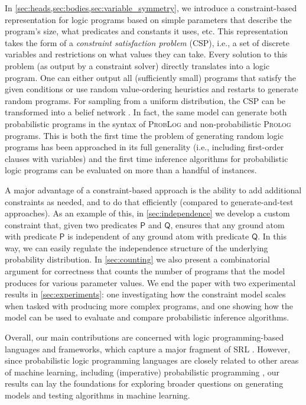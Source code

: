 \documentclass[runningheads]{llncs}
\begin{document}
In \cref{sec:heads,sec:bodies,sec:variable_symmetry}, we introduce a
constraint-based representation for logic programs based on simple parameters
that describe the program's size, what predicates and constants it uses, etc.
This representation takes the form of a \emph{constraint satisfaction problem}
(CSP), i.e., a set of discrete variables and restrictions on what values they
can take. Every solution to this problem (as output by a constraint solver)
directly translates into a logic program. One can either output all
(sufficiently small) programs that satisfy the given conditions or use random
value-ordering heuristics and restarts to generate random programs. For sampling
from a uniform distribution, the CSP can be transformed into a belief network
\cite{DBLP:conf/aaai/DechterKBE02}. In fact, the same model can generate both
probabilistic programs in the syntax of \textsc{ProbLog}
\cite{DBLP:conf/ijcai/RaedtKT07} and non-probabilistic \textsc{Prolog} programs.
This is both the first time the problem of generating random logic programs has
been approached in its full generality (i.e., including first-order clauses with
variables) and the first time inference algorithms for probabilistic logic
programs can be evaluated on more than a handful of instances.

A major advantage of a constraint-based approach is the ability to add
additional constraints as needed, and to do that efficiently (compared to
generate-and-test approaches). As an example of this, in \cref{sec:independence}
we develop a custom constraint that, given two predicates $\mathsf{P}$ and
$\mathsf{Q}$, ensures that any ground atom with predicate $\mathsf{P}$ is
independent of any ground atom with predicate $\mathsf{Q}$. In this way, we can
easily regulate the independence structure of the underlying probability
distribution. In \cref{sec:counting} we also present a combinatorial argument
for correctness that counts the number of programs that the model produces for
various parameter values. We end the paper with two experimental results in
\cref{sec:experiments}: one investigating how the constraint model scales when
tasked with producing more complex programs, and one showing how the model can
be used to evaluate and compare probabilistic inference algorithms.

Overall, our main contributions are concerned with logic programming-based
languages and frameworks, which capture a major fragment of SRL
\cite{DBLP:series/synthesis/2016Raedt}. However, since probabilistic logic
programming languages are closely related to other areas of machine learning,
including (imperative) probabilistic programming
\cite{DBLP:journals/ml/RaedtK15}, our results can lay the foundations for
exploring broader questions on generating models and testing algorithms in
machine learning.
\end{document}
